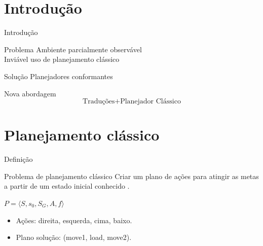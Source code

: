 \begin{frame}
  \titlepage
\end{frame}


\section{Introdução}
\begin{frame}{Introdução}
    
    \begin{block}{Problema}
        Ambiente parcialmente observável\\
        \pause
        Inviável uso de planejamento clássico
    \end{block}
    \pause
    \begin{block}{Solução}
        Planejadores conformantes
    \end{block}
    \pause
    \begin{block}{Nova abordagem}
        \[ \text{Traduções} + \text{Planejador Clássico} \]
    \end{block}

\end{frame}


\section{Planejamento clássico}
\begin{frame}{Definição}
    \begin{block}{Problema de planejamento clássico}
        Criar um plano de ações para atingir as metas a partir de um estado 
inicial conhecido \cite{Ghallab:2004}. \\
        \begin{center}
            $P = \langle S, s_0, S_G, A, f \rangle$
        \end{center}
    \end{block}
    
    \begin{multicols}{2}
        \centering
    \columnbreak
        \begin{itemize}
        \item Ações: direita, esquerda, cima, baixo.
        
        \item Plano solução: (move1, load, move2).
        \end{itemize} 
    \end{multicols}
    
\end{frame}

